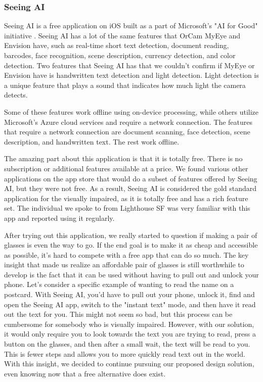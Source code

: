 \documentclass[a4paper,11pt]{article}
\begin{document}
\subsubsection{Seeing AI}
Seeing AI is a free application on iOS built as a part of Microsoft's "AI for Good" initiative \cite{seeing-ai}. Seeing AI has a lot of the same features that OrCam MyEye and Envision have, such as real-time short text detection, document reading, barcodes, face recognition, scene description, currency detection, and color detection. Two features that Seeing AI has that we couldn't confirm if MyEye or Envision have is handwritten text detection and light detection. Light detection is a unique feature that plays a sound that indicates how much light the camera detects. 

Some of these features work offline using on-device processing, while others utilize Microsoft's Azure cloud services and require a network connection. The features that require a network connection are document scanning, face detection, scene description, and handwritten text. The rest work offline.

The amazing part about this application is that it is totally free. There is no subscription or additional features available at a price. We found various other applications on the app store that would do a subset of features offered by Seeing AI, but they were not free. As a result, Seeing AI is considered the gold standard application for the visually impaired, as it is totally free and has a rich feature set. The individual we spoke to from Lighthouse SF was very familiar with this app and reported using it regularly.

After trying out this application, we really started to question if making a pair of glasses is even the way to go. If the end goal is to make it as cheap and accessible as possible, it's hard to compete with a free app that can do so much. The key insight that made us realize an affordable pair of glasses is still worthwhile to develop is the fact that it can be used without having to pull out and unlock your phone. Let's consider a specific example of wanting to read the name on a postcard. With Seeing AI, you'd have to pull out your phone, unlock it, find and open the Seeing AI app, switch to the "instant text" mode, and then have it read out the text for you. This might not seem so bad, but this process can be cumbersome for somebody who is visually impaired. However, with our solution, it would only require you to look towards the text you are trying to read, press a button on the glasses, and then after a small wait, the text will be read to you. This is fewer steps and allows you to more quickly read text out in the world. With this insight, we decided to continue pursuing our proposed design solution, even knowing now that a free alternative does exist.
\end{document}
